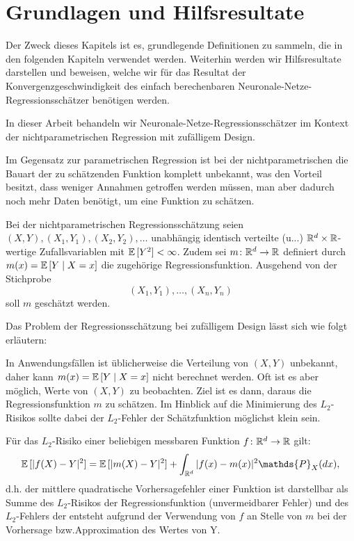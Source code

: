 \chapter{Grundlagen und Hilfsresultate}
\label{chap:1}

Der Zweck dieses Kapitels ist es, grundlegende Definitionen zu sammeln, die in den folgenden Kapiteln verwendet werden. Weiterhin werden wir Hilfsresultate darstellen und beweisen, welche wir für das Resultat der Konvergenzgeschwindigkeit des einfach berechenbaren Neuronale-Netze-Regressionsschätzer benötigen werden.

In dieser Arbeit behandeln wir Neuronale-Netze-Regressionsschätzer im Kontext der nichtparametrischen Regression mit zufälligem Design. 

Im Gegensatz zur parametrischen Regression ist bei der nichtparametrischen die Bauart der zu schätzenden Funktion komplett unbekannt, was den Vorteil besitzt, dass weniger Annahmen getroffen werden müssen, man aber dadurch noch mehr Daten benötigt, um eine Funktion zu schätzen.

Bei der nichtparametrischen Regressionsschätzung seien $(X, Y), (X_1, Y_1), (X_2, Y_2), \dots$ unabhängig identisch verteilte (u.\@i.\@v.\@) $\mathbb{R}^d \times \mathbb{R}$-wertige Zufallsvariablen mit $\mathbb{E}\,[Y^2] < \infty$. Zudem sei $m\colon \mathbb{R}^d \to \mathbb{R}$ definiert durch $m(x) = \mathbb{E}\,[Y \mid X = x]$ die zugehörige Regressionsfunktion. Ausgehend von der Stichprobe
$$ (X_1, Y_1),\dots,(X_n, Y_n)$$ 
soll $m$ geschätzt werden.

Das Problem der Regressionsschätzung bei zufälligem Design lässt sich wie folgt erläutern: 

In Anwendungsfällen ist üblicherweise die Verteilung von $(X, Y)$ unbekannt, daher kann $m(x) = \mathbb{E}\,[Y \mid X = x]$ nicht berechnet werden. Oft ist es aber möglich, Werte von $(X, Y)$ zu beobachten. Ziel ist es dann, daraus die Regressionsfunktion $m$ zu schätzen. Im Hinblick auf die Minimierung des $L_2$-Risikos sollte dabei der $L_2$-Fehler der Schätzfunktion möglichst klein sein. 

Für das $L_2$-Risiko einer beliebigen messbaren Funktion $f\colon \mathbb{R}^d \to \mathbb{R}$  gilt$\colon$
$$\E[|f(X) - Y|^2] = \E[|m(X) - Y|^2] + \int_{\R^d}|f(x) - m(x)|^2 \mathds{P}_X (dx),$$
d.h. der mittlere quadratische Vorhersagefehler einer Funktion ist darstellbar als Summe des $L_2$-Risikos der Regressionsfunktion (unvermeidbarer Fehler) und des $L_2$-Fehlers der entsteht aufgrund der Verwendung von $f$ an Stelle von $m$ bei der Vorhersage bzw.\@ Approximation des Wertes von Y.

